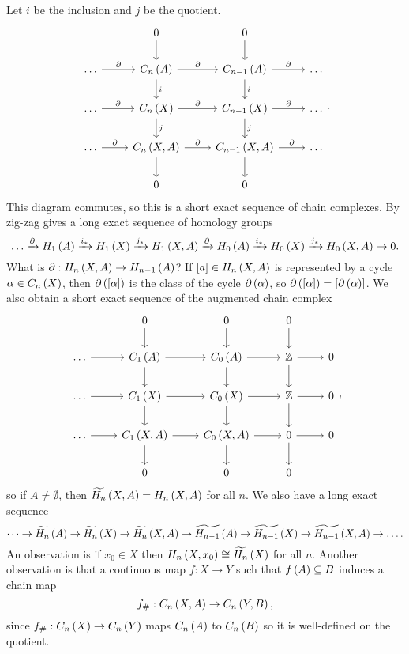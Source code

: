 Let $ i $ be the inclusion and $ j $ be the quotient.
$$
\begin{tikzcd}
& 0 \arrow{d} & 0 \arrow{d} & \\
\dots \arrow{r}{\partial} & C_n\rb{A} \arrow{r}{\partial} \arrow{d}{i} & C_{n - 1}\rb{A} \arrow{r}{\partial} \arrow{d}{i} & \dots \\
\dots \arrow{r}{\partial} & C_n\rb{X} \arrow{r}{\partial} \arrow{d}{j} & C_{n - 1}\rb{X} \arrow{r}{\partial} \arrow{d}{j} & \dots \\
\dots \arrow{r}{\partial} & C_n\rb{X, A} \arrow{r}{\partial} \arrow{d} & C_{n - 1}\rb{X, A} \arrow{r}{\partial} \arrow{d} & \dots \\
& 0 & 0 &
\end{tikzcd}.
$$
This diagram commutes, so this is a short exact sequence of chain complexes. By zig-zag gives a long exact sequence of homology groups
$$ \dots \xrightarrow{\partial} H_1\left( A \right) \xrightarrow{i_*} H_1\left( X \right) \xrightarrow{j_*} H_1\left( X, A \right) \xrightarrow{\partial} H_0\left( A \right) \xrightarrow{i_*} H_0\left( X \right) \xrightarrow{j_*} H_0\left( X, A \right) \to 0. $$
What is $ \partial : H_n\left( X, A \right) \to H_{n - 1}\left( A \right) $? If $ \left[ a \right] \in H_n\left( X, A \right) $ is represented by a cycle $ \alpha \in C_n\left( X \right) $, then $ \partial\left( \left[ \alpha \right] \right) $ is the class of the cycle $ \partial\left( \alpha \right) $, so $ \partial\left( \left[ \alpha \right] \right) = \left[ \partial\left( \alpha \right) \right] $. We also obtain a short exact sequence of the augmented chain complex
$$
\begin{tikzcd}
& 0 \arrow{d} & 0 \arrow{d} & 0 \arrow{d} & \\
\dots \arrow{r} & C_1\rb{A} \arrow{r} \arrow{d} & C_0\rb{A} \arrow{r} \arrow{d} & \Z \arrow{r} \arrow{d} & 0 \\
\dots \arrow{r} & C_1\rb{X} \arrow{r} \arrow{d} & C_0\rb{X} \arrow{r} \arrow{d} & \Z \arrow{r} \arrow{d} & 0 \\
\dots \arrow{r} & C_1\rb{X, A} \arrow{r} \arrow{d} & C_0\rb{X, A} \arrow{r} \arrow{d} & 0 \arrow{r} \arrow{d} & 0 \\
& 0 & 0 & 0 &
\end{tikzcd},
$$
so if $ A \ne \emptyset $, then $ \widetilde{H_n}\left( X, A \right) = H_n\left( X, A \right) $ for all $ n $. We also have a long exact sequence
$$ \dots \to \widetilde{H_n}\left( A \right) \to \widetilde{H_n}\left( X \right) \to \widetilde{H_n}\left( X, A \right) \to \widetilde{H_{n - 1}}\left( A \right) \to \widetilde{H_{n - 1}}\left( X \right) \to \widetilde{H_{n - 1}}\left( X, A \right) \to \dots. $$
An observation is if $ x_0 \in X $ then $ H_n\left( X, x_0 \right) \cong \widetilde{H_n}\left( X \right) $ for all $ n $. Another observation is that a continuous map $ f : X \to Y $ such that $ f\left( A \right) \subseteq B $ induces a chain map
$$ f_\# : C_n\left( X, A \right) \to C_n\left( Y, B \right), $$
since $ f_\# : C_n\left( X \right) \to C_n\left( Y \right) $ maps $ C_n\left( A \right) $ to $ C_n\left( B \right) $ so it is well-defined on the quotient.


